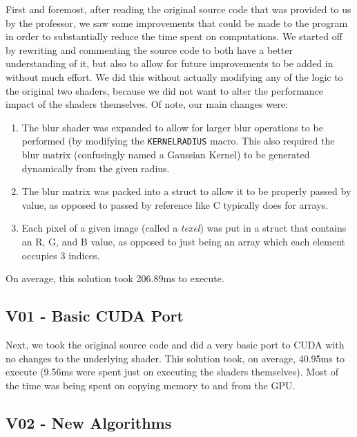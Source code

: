 \documentclass[10pt,journal,compsoc]{IEEEtran}
\def\code#1{\texttt{#1}}
\begin{document}
\noindent First and foremost, after reading the original source code that was provided to us by the professor, we saw some improvements that could be made to the program in order to substantially reduce the time spent on computations. We started off by rewriting and commenting the source code to both have a better understanding of it, but also to allow for future improvements to be added in without much effort. We did this without actually modifying any of the logic to the original two shaders, because we did not want to alter the performance impact of the shaders themselves. Of note, our main changes were:
\begin{enumerate}
  \item The blur shader was expanded to allow for larger blur operations to be performed (by modifying the \code{KERNELRADIUS} macro. This also required the blur matrix (confusingly named a Gaussian Kernel) to be generated dynamically from the given radius.
  \item The blur matrix was packed into a struct to allow it to be properly passed by value, as opposed to passed by reference like C typically does for arrays.
  \item Each pixel of a given image (called a \textit{texel}) was put in a struct that contains an R, G, and B value, as opposed to just being an array which each element occupies 3 indices.
\end{enumerate}

\noindent On average, this solution took 206.89ms to execute. \\


\subsection{V01 - Basic CUDA Port}
\label{sec:V01}

\noindent Next, we took the original source code and did a very basic port to CUDA with no changes to the underlying shader. This solution took, on average, 40.95ms to execute (9.56ms were spent just on executing the shaders themselves). Most of the time was being spent on copying memory to and from the GPU. \\


\subsection{V02 - New Algorithms}
\label{sec:V02}
\end{document}

